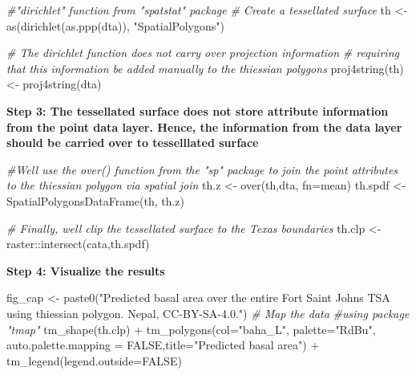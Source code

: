 \documentclass[
]{book}
\newenvironment{Shaded}{\begin{snugshade}}{\end{snugshade}}
\newcommand{\AttributeTok}[1]{\textcolor[rgb]{0.77,0.63,0.00}{#1}}
\newcommand{\CommentTok}[1]{\textcolor[rgb]{0.56,0.35,0.01}{\textit{#1}}}
\newcommand{\ConstantTok}[1]{\textcolor[rgb]{0.00,0.00,0.00}{#1}}
\newcommand{\FunctionTok}[1]{\textcolor[rgb]{0.00,0.00,0.00}{#1}}
\newcommand{\NormalTok}[1]{#1}
\newcommand{\OtherTok}[1]{\textcolor[rgb]{0.56,0.35,0.01}{#1}}
\newcommand{\SpecialCharTok}[1]{\textcolor[rgb]{0.00,0.00,0.00}{#1}}
\newcommand{\StringTok}[1]{\textcolor[rgb]{0.31,0.60,0.02}{#1}}
\begin{document}
\begin{Shaded}
\begin{Highlighting}[]
\CommentTok{\#"dirichlet" function from "spatstat" package}
\CommentTok{\# Create a tessellated surface}
\NormalTok{th  }\OtherTok{\textless{}{-}}  \FunctionTok{as}\NormalTok{(}\FunctionTok{dirichlet}\NormalTok{(}\FunctionTok{as.ppp}\NormalTok{(dta)), }\StringTok{"SpatialPolygons"}\NormalTok{)}

\CommentTok{\# The dirichlet function does not carry over projection information}
\CommentTok{\# requiring that this information be added manually to the thiessian polygons}
\FunctionTok{proj4string}\NormalTok{(th) }\OtherTok{\textless{}{-}} \FunctionTok{proj4string}\NormalTok{(dta)}
\end{Highlighting}
\end{Shaded}

\textbf{Step 3: The tessellated surface does not store attribute information from the point data layer. Hence, the information from the data layer should be carried over to tesselllated surface }

\begin{Shaded}
\begin{Highlighting}[]
\CommentTok{\#We\textquotesingle{}ll use the over() function from the "sp" package to join the point attributes to the thiessian polygon via spatial join}
\NormalTok{th.z     }\OtherTok{\textless{}{-}} \FunctionTok{over}\NormalTok{(th,dta, }\AttributeTok{fn=}\NormalTok{mean)}
\NormalTok{th.spdf  }\OtherTok{\textless{}{-}}  \FunctionTok{SpatialPolygonsDataFrame}\NormalTok{(th, th.z)}

\CommentTok{\# Finally, we\textquotesingle{}ll clip the tessellated  surface to the Texas boundaries}
\NormalTok{th.clp   }\OtherTok{\textless{}{-}}\NormalTok{ raster}\SpecialCharTok{::}\FunctionTok{intersect}\NormalTok{(cata,th.spdf)}
\end{Highlighting}
\end{Shaded}

\textbf{Step 4: Visualize the results}

\begin{Shaded}
\begin{Highlighting}[]
\NormalTok{fig\_cap }\OtherTok{\textless{}{-}} \FunctionTok{paste0}\NormalTok{(}\StringTok{"Predicted basal area over the entire Fort Saint Johns TSA using thiessian polygon. Nepal, CC{-}BY{-}SA{-}4.0."}\NormalTok{)}
\CommentTok{\# Map the data}
\CommentTok{\#using package "tmap"}
\FunctionTok{tm\_shape}\NormalTok{(th.clp) }\SpecialCharTok{+}
  \FunctionTok{tm\_polygons}\NormalTok{(}\AttributeTok{col=}\StringTok{"baha\_L"}\NormalTok{, }\AttributeTok{palette=}\StringTok{"RdBu"}\NormalTok{, }\AttributeTok{auto.palette.mapping =} \ConstantTok{FALSE}\NormalTok{,}\AttributeTok{title=}\StringTok{"Predicted basal area"}\NormalTok{) }\SpecialCharTok{+}
  \FunctionTok{tm\_legend}\NormalTok{(}\AttributeTok{legend.outside=}\ConstantTok{FALSE}\NormalTok{)}
\end{Highlighting}
\end{Shaded}
\end{document}
